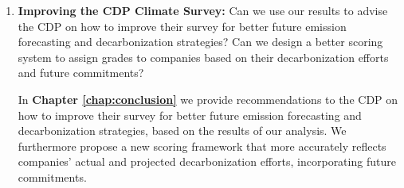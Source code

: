\begin{enumerate}
    \item \textbf{Improving the CDP Climate Survey:} Can we use our results to advise the CDP on how to improve their survey for better future emission forecasting and decarbonization strategies? Can we design a better scoring system to assign grades to companies based on their decarbonization efforts and future commitments?
    
    In \textbf{Chapter \ref{chap:conclusion}} we provide recommendations to the CDP on how to improve their survey for better future emission forecasting and decarbonization strategies, based on the results of our analysis. We furthermore propose a new scoring framework that more accurately reflects companies' actual and projected decarbonization efforts, incorporating future commitments.


\end{enumerate}

